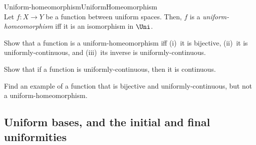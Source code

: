 \begin{dfn}{Uniform-homeomorphism}{UniformHomeomorphism}
\\
Let $f\colon X\rightarrow Y$ be a function between uniform spaces.  Then, $f$ is a \emph{uniform-homeomorphism} iff it is an isomorphism in $\Uni$.
\end{dfn}
\begin{exr}{}{}
Show that a function is a uniform-homeomorphism iff (i)~it is bijective, (ii)~it is uniformly-continuous, and (iii)~its inverse is uniformly-continuous.
\end{exr}
\begin{exr}{}{}
Show that if a function is uniformly-continuous, then it is continuous.
\end{exr}
\begin{exr}{}{}
Find an example of a function that is bijective and uniformly-continuous, but not a uniform-homeomorphism.
\end{exr}

\subsection{Uniform bases, and the initial and final uniformities}

